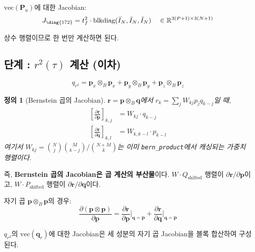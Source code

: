 \documentclass[11pt]{article}
\newtheorem{definition}{정의}
\begin{document}
$\text{vec}(\mathbf{P}_u)$에 대한 Jacobian:
\begin{equation}
  J_{\ding{172}} = t_f^2 \cdot \text{blkdiag}(\bar{I}_N, \bar{I}_N, \bar{I}_N)
  \quad \in \mathbb{R}^{3(P+1) \times 3(N+1)}
  \label{eq:J1}
\end{equation}

상수 행렬이므로 한 번만 계산하면 된다.

\subsection{단계 : $r^2(\tau)$ 계산 (이차)}

\begin{equation}
  q_{r^2} = \mathbf{p}_x \otimes_B \mathbf{p}_x
           + \mathbf{p}_y \otimes_B \mathbf{p}_y
           + \mathbf{p}_z \otimes_B \mathbf{p}_z
\end{equation}

\begin{definition}[Bernstein 곱의 Jacobian]
$\mathbf{r} = \mathbf{p} \otimes_B \mathbf{q}$에서 $r_k = \sum_j W_{kj} p_j q_{k-j}$일 때,
\begin{align}
  \left[\frac{\partial\mathbf{r}}{\partial\mathbf{p}}\right]_{k,j}
    &= W_{kj} \cdot q_{k-j}
  \label{eq:Jr_p} \\
  \left[\frac{\partial\mathbf{r}}{\partial\mathbf{q}}\right]_{k,l}
    &= W_{k,k-l} \cdot p_{k-l}
  \label{eq:Jr_q}
\end{align}
여기서 $W_{kj} = \binom{N}{j}\binom{M}{k-j}/\binom{N+M}{k}$는
이미 \texttt{bern\_product}에서 캐싱되는 가중치 행렬이다.
\end{definition}

즉, \textbf{Bernstein 곱의 Jacobian은 곱 계산의 부산물}이다.
$W \cdot Q_{\mathrm{shifted}}$ 행렬이 $\partial\mathbf{r}/\partial\mathbf{p}$이고,
$W \cdot P_{\mathrm{shifted}}$ 행렬이 $\partial\mathbf{r}/\partial\mathbf{q}$이다.

자기 곱 $\mathbf{p} \otimes_B \mathbf{p}$의 경우:
\begin{equation}
  \frac{\partial(\mathbf{p}\otimes\mathbf{p})}{\partial\mathbf{p}}
  = \frac{\partial\mathbf{r}}{\partial\mathbf{p}}\bigg|_{\mathbf{q}=\mathbf{p}}
  + \frac{\partial\mathbf{r}}{\partial\mathbf{q}}\bigg|_{\mathbf{q}=\mathbf{p}}
  \label{eq:self_product}
\end{equation}

$q_{r^2}$의 $\text{vec}(\mathbf{q}_r)$에 대한 Jacobian은
세 성분의 자기 곱 Jacobian을 블록 합산하여 구성된다.
\end{document}
